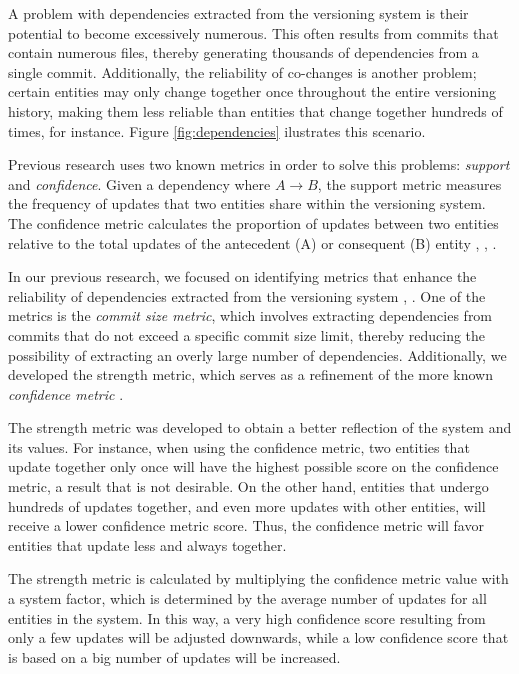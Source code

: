 \documentclass[conference]{IEEEtran}
\begin{document}
A problem with dependencies extracted from the versioning system is their potential to become excessively numerous. This often results from commits that contain numerous files, thereby generating thousands of dependencies from a single commit. Additionally, the reliability of co-changes is another problem; certain entities may only change together once throughout the entire versioning history, making them less reliable than entities that change together hundreds of times, for instance. Figure \ref{fig:dependencies} ilustrates this scenario.

Previous research uses two known metrics in order to solve this problems: \textit{support} and \textit{confidence}. Given a dependency where $A \rightarrow B$, the support metric measures the frequency of updates that two entities share within the versioning system. The confidence metric calculates the proportion of updates between two entities relative to the total updates of the antecedent (A) or consequent (B) entity \cite{DBLP:conf/issre/OlivaG15}, \cite{DBLP:journals/jss/AjienkaC17}, \cite{Zimmermann:2004:MVH:998675.999460}.


In our previous research, we focused on identifying metrics that enhance the reliability of dependencies extracted from the versioning system \cite{saci19}, \cite{enase19}. One of the metrics is the \textit{commit size metric}, which involves extracting dependencies from commits that do not exceed a specific commit size limit, thereby reducing the possibility of extracting an overly large number of dependencies. Additionally, we developed the strength metric, which serves as a refinement of the more known \textit{confidence metric} \cite{articlekeyclass23}.


The strength metric was developed to obtain a better reflection of the system and its values. For instance, when using the confidence metric, two entities that update together only once will have the highest possible score on the confidence metric, a result that is not desirable. On the other hand, entities that undergo hundreds of updates together, and even more updates with other entities, will receive a lower confidence metric score. Thus, the confidence metric will favor entities that update less and always together.

 The strength metric is calculated by multiplying the confidence metric value with a system factor, which is determined by the average number of updates for all entities in the system. In this way, a very high confidence score resulting from only a few updates will be adjusted downwards, while a low confidence score that is based on a big number of updates will be increased.
\end{document}
